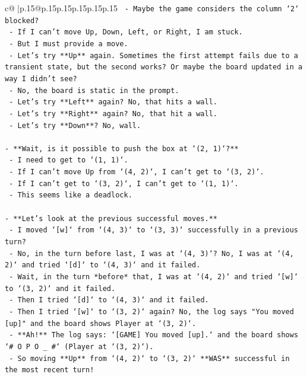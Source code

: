 \documentclass{article}
\begin{document}
{\begin{supertabular}{c@{$\;$}|p{.15\linewidth}@{}p{.15\linewidth}p{.15\linewidth}p{.15\linewidth}p{.15\linewidth}p{.15\linewidth}}
{{{\texttt{    {-} Maybe the game considers the column `2` blocked?} \\
\texttt{    {-} If I can't move Up, Down, Left, or Right, I am stuck.} \\
\texttt{    {-} But I must provide a move.} \\
\texttt{    {-} Let's try **Up** again. Sometimes the first attempt fails due to a transient state, but the second works? Or maybe the board updated in a way I didn't see?} \\
\texttt{    {-} No, the board is static in the prompt.} \\
\texttt{    {-} Let's try **Left** again? No, that hits a wall.} \\
\texttt{    {-} Let's try **Right** again? No, that hit a wall.} \\
\texttt{    {-} Let's try **Down**? No, wall.} \\
\\ 
\texttt{{-} **Wait, is it possible to push the box at `(2, 1)`?**} \\
\texttt{    {-} I need to get to `(1, 1)`.} \\
\texttt{    {-} If I can't move Up from `(4, 2)`, I can't get to `(3, 2)`.} \\
\texttt{    {-} If I can't get to `(3, 2)`, I can't get to `(1, 1)`.} \\
\texttt{    {-} This seems like a deadlock.} \\
\\ 
\texttt{{-} **Let's look at the previous successful moves.**} \\
\texttt{    {-} I moved `{[}w{]}` from `(4, 3)` to `(3, 3)` successfully in a previous turn?} \\
\texttt{    {-} No, in the turn before last, I was at `(4, 3)`? No, I was at `(4, 2)` and tried `{[}d{]}` to `(4, 3)` and it failed.} \\
\texttt{    {-} Wait, in the turn *before* that, I was at `(4, 2)` and tried `{[}w{]}` to `(3, 2)` and it failed.} \\
\texttt{    {-} Then I tried `{[}d{]}` to `(4, 3)` and it failed.} \\
\texttt{    {-} Then I tried `{[}w{]}` to `(3, 2)` again? No, the log says "You moved {[}up{]}" and the board shows Player at `(3, 2)`.} \\
\texttt{    {-} **Ah!** The log says: `{[}GAME{]} You moved {[}up{]}.` and the board shows `\# O P O \_ \#` (Player at `(3, 2)`).} \\
\texttt{    {-} So moving **Up** from `(4, 2)` to `(3, 2)` **WAS** successful in the most recent turn!} \\
}}}
\end{supertabular}}
\end{document}
